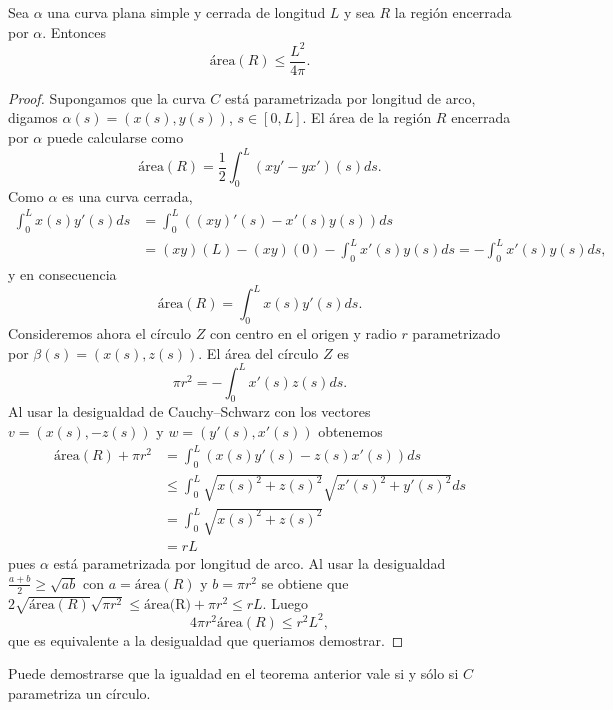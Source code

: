 \begin{theorem}
	Sea $\alpha$ una curva plana simple y cerrada de longitud $L$ y sea $R$ 
	la región encerrada por $\alpha$. Entonces
	\[
		\text{área}(R)\leq \frac{L^2}{4\pi}.
	\]
\end{theorem}

\begin{proof}
	Supongamos que la curva $C$ está parametrizada por longitud de arco,
	digamos $\alpha(s)=(x(s),y(s))$, $s\in[0,L]$. 
	El área de la región $R$ encerrada por $\alpha$ puede
	calcularse como
	\[
		\text{área}(R)=\frac12\int_0^L(xy'-yx')(s)ds.%
	\]
	Como $\alpha$ es una curva cerrada, 
	\begin{align*}
		\int_0^Lx(s)y'(s)ds&=\int_0^L((xy)'(s)-x'(s)y(s))ds\\
		&=(xy)(L)-(xy)(0)-\int_0^Lx'(s)y(s)ds=-\int_0^L x'(s)y(s)ds,
	\end{align*}
	y en consecuencia 
	\[
		\text{área}(R)=\int_0^Lx(s)y'(s)ds.
	\]
	Consideremos ahora el círculo $Z$ con centro en el origen y radio $r$
	parametrizado por $\beta(s)=(x(s),z(s))$.  El área del círculo $Z$ es
	\[
		\pi r^2=-\int_0^Lx'(s)z(s)ds.
	\]
	Al usar la desigualdad de Cauchy--Schwarz con los vectores $v=(x(s),-z(s))$
	y $w=(y'(s),x'(s))$ obtenemos 
	\begin{equation}
	\label{eq:isopetrimetrica1}
	\begin{aligned}
		\text{área}(R)+\pi r^2&=\int_0^L(x(s)y'(s)-z(s)x'(s))ds\\
		&\leq\int_0^L\sqrt{x(s)^2+z(s)^2}\sqrt{x'(s)^2+y'(s)^2}ds\\
		&=\int_0^L\sqrt{x(s)^2+z(s)^2}\\
		&=rL
	\end{aligned}
	\end{equation}
	pues $\alpha$ está parametrizada por longitud de arco. 
	Al usar la desigualdad 
	$\frac{a+b}{2}\geq \sqrt{ab}$ con $a=\text{área}(R)$ y $b=\pi r^2$ se obtiene que 
	$2\sqrt{\text{área}(R)}\sqrt{\pi r^2}\leq \text{área(R)}+\pi r^2\leq rL$. 
	Luego 
	\begin{equation}
		\label{eq:isoperimetrica2}
	4\pi r^2\text{área}(R)\leq r^2L^2,
	\end{equation}
	que es equivalente a la
	desigualdad que queriamos demostrar.
\end{proof}

Puede demostrarse que la igualdad en el teorema anterior vale si y sólo si
$C$ parametriza un círculo.


